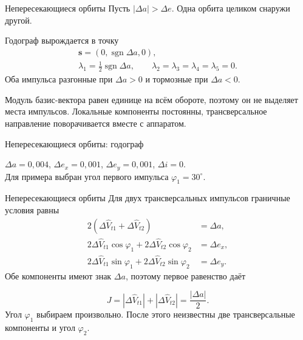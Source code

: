 \documentclass[11pt,aspectratio=169,t]{beamer}
\newcommand{\figcaption}[1]{{\usebeamerfont{caption}\color{coursemuted}#1\par}}
\newcommand{\derivationmathspacing}{%
  \setlength{\abovedisplayskip}{2pt}%
  \setlength{\belowdisplayskip}{3pt}%
  \setlength{\abovedisplayshortskip}{2pt}%
  \setlength{\belowdisplayshortskip}{2pt}%
  \setlength{\jot}{2pt}}
\begin{document}
\begin{frame}{Непересекающиеся орбиты}
\relax
Пусть $|\Delta a|>\Delta e$. Одна орбита целиком снаружи другой.
\begin{block}{Годограф вырождается в точку}
\derivationmathspacing
\[
\begin{gathered}
 \boldsymbol s=(0,\operatorname{sgn}\Delta a,0),\\
 \lambda_1=\tfrac12\operatorname{sgn}\Delta a,\qquad
 \lambda_2=\lambda_3=\lambda_4=\lambda_5=0.
\end{gathered}
\]
Оба импульса разгонные при $\Delta a>0$ и тормозные при $\Delta a<0$.
\end{block}
{\justifying
Модуль базис-вектора равен единице на всём обороте,
поэтому он не выделяет места импульсов. Локальные компоненты
постоянны, трансверсальное направление поворачивается вместе с аппаратом.
\par}
\end{frame}

\begin{frame}{Непересекающиеся орбиты: годограф}
\relax
\centering

\par
\figcaption{$\Delta a=0{,}004$, $\Delta e_x=0{,}001$, $\Delta e_y=0{,}001$, $\Delta i=0$.\\
Для примера выбран угол первого импульса $\varphi_1=30^\circ$.}
\end{frame}

\begin{frame}{Непересекающиеся орбиты}
\relax
\derivationmathspacing
Для двух трансверсальных импульсов граничные условия равны
\[
\begin{aligned}
 2(\Delta\widehat V_{t1}+\Delta\widehat V_{t2})&=\Delta a,\\
 2\Delta\widehat V_{t1}\cos\varphi_1
  +2\Delta\widehat V_{t2}\cos\varphi_2&=\Delta e_x,\\
 2\Delta\widehat V_{t1}\sin\varphi_1
  +2\Delta\widehat V_{t2}\sin\varphi_2&=\Delta e_y.
\end{aligned}
\]
\justifying
Обе компоненты имеют знак $\Delta a$, поэтому первое равенство даёт
\par
\[
 J=|\Delta\widehat V_{t1}|+|\Delta\widehat V_{t2}|
   =\frac{|\Delta a|}{2}.
\]
\justifying
Угол $\varphi_1$ выбираем произвольно. После этого неизвестны
две трансверсальные компоненты и угол $\varphi_2$.
\end{frame}
\end{document}
